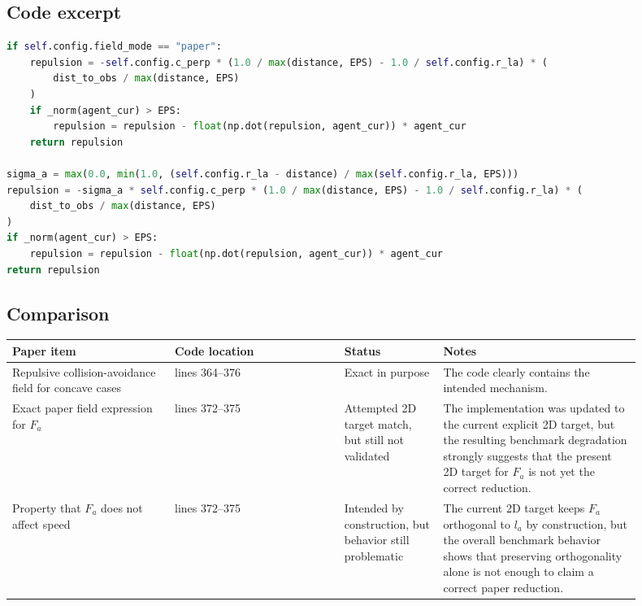 \documentclass[11pt]{article}
\begin{document}
\subsection*{Code excerpt}

\begin{lstlisting}[language=Python]
if self.config.field_mode == "paper":
    repulsion = -self.config.c_perp * (1.0 / max(distance, EPS) - 1.0 / self.config.r_la) * (
        dist_to_obs / max(distance, EPS)
    )
    if _norm(agent_cur) > EPS:
        repulsion = repulsion - float(np.dot(repulsion, agent_cur)) * agent_cur
    return repulsion

sigma_a = max(0.0, min(1.0, (self.config.r_la - distance) / max(self.config.r_la, EPS)))
repulsion = -sigma_a * self.config.c_perp * (1.0 / max(distance, EPS) - 1.0 / self.config.r_la) * (
    dist_to_obs / max(distance, EPS)
)
if _norm(agent_cur) > EPS:
    repulsion = repulsion - float(np.dot(repulsion, agent_cur)) * agent_cur
return repulsion
\end{lstlisting}

\subsection*{Comparison}

\begin{longtable}{|p{0.23\linewidth}|p{0.24\linewidth}|p{0.14\linewidth}|p{0.29\linewidth}|}
\hline
\textbf{Paper item} & \textbf{Code location} & \textbf{Status} & \textbf{Notes} \\
\hline
Repulsive collision-avoidance field for concave cases & lines 364--376 & Exact in purpose & The code clearly contains the intended mechanism. \\
\hline
Exact paper field expression for \(F_a\) & lines 372--375 & Attempted 2D target match, but still not validated & The implementation was updated to the current explicit 2D target, but the resulting benchmark degradation strongly suggests that the present 2D target for \(F_a\) is not yet the correct reduction. \\
\hline
Property that \(F_a\) does not affect speed & lines 372--375 & Intended by construction, but behavior still problematic & The current 2D target keeps \(F_a\) orthogonal to \(l_a\) by construction, but the overall benchmark behavior shows that preserving orthogonality alone is not enough to claim a correct paper reduction. \\
\hline
\end{longtable}
\end{document}
